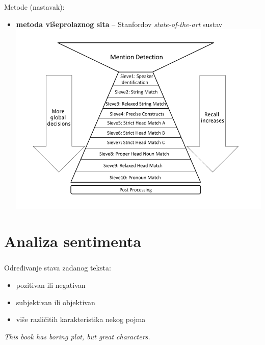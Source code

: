 \documentclass[t, xcolor={usenames,dvipsnames,svgnames,table}]{beamer}
\begin{document}
	\begin{frame}
		\frametitle{\secname}
		
		Metode (nastavak):
		\begin{itemize}
			\item 	\textbf{metoda višeprolaznog sita} -- Stanfordov \textit{state-of-the-art} sustav \\
				\includegraphics[scale = 0.4]{sieve.png}
			
		\end{itemize}
		
	\end{frame}


\section{Analiza sentimenta}
	
	\begin{frame}
		\sectionpage
	\end{frame}

	\begin{frame}
		\frametitle{\secname}
		
		Određivanje stava zadanog teksta:
		\begin{itemize}
			\item	pozitivan ili negativan
			\item 	subjektivan ili objektivan
			\item 	više različitih karakteristika nekog pojma
		\end{itemize}
		
		\bigskip
		
		\begin{displayquote}
			\textit{This book has boring plot, but great characters.}
		\end{displayquote}
	\end{frame}
	
\end{document}
